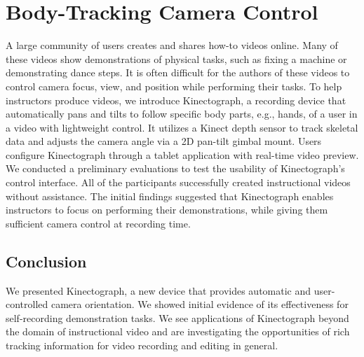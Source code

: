 \chapter{Body-Tracking Camera Control}

A large community of users creates and shares how-to videos online. Many of these videos show demonstrations of physical tasks, such as fixing a machine or demonstrating dance steps. It is often difficult for the authors of these videos to control camera focus, view, and position while performing their tasks. To help instructors produce videos, we introduce Kinectograph, a recording device that automatically pans and tilts to follow specific body parts, e.g., hands, of a user in a video with lightweight control. It utilizes a Kinect depth sensor to track skeletal data and adjusts the camera angle via a 2D pan-tilt gimbal mount. Users configure Kinectograph through a tablet application with real-time video preview. We conducted a preliminary evaluations to test the usability of Kinectograph's control interface. All of the participants successfully created instructional videos without assistance. The initial findings suggested that Kinectograph enables instructors to focus on performing their demonstrations, while giving them sufficient camera control at recording time.











\section{Conclusion}
We presented Kinectograph, a new device that provides automatic and user-controlled camera orientation. We showed initial evidence of its effectiveness for self-recording demonstration tasks. We see applications of Kinectograph beyond the domain of instructional video and are investigating the opportunities of rich tracking information for video recording and editing in general.


